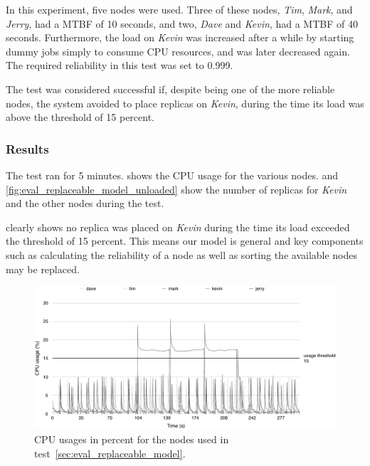 \documentclass{cslthse-msc}
\begin{document}
In this experiment, five nodes were used. Three of these nodes, \emph{Tim}, \emph{Mark}, and \emph{Jerry}, had a MTBF of 10 seconds, and two, \emph{Dave} and \emph{Kevin}, had a MTBF of 40 seconds. Furthermore, the load on \emph{Kevin} was increased after a while by starting dummy jobs simply to consume CPU resources, and was later decreased again. The required reliability in this test was set to 0.999.

The test was considered successful if, despite being one of the more reliable nodes, the system avoided to place replicas on \emph{Kevin}, during the time its load was above the threshold of 15 percent.

\subsubsection*{Results}
The test ran for 5 minutes.  shows the CPU usage for the various nodes.  and \cref{fig:eval_replaceable_model_unloaded} show the number of replicas for \emph{Kevin} and the other nodes during the test.

 clearly shows no replica was placed on \emph{Kevin} during the time its load exceeded the threshold of 15 percent. This means our model is general and key components such as calculating the reliability of a node as well as sorting the available nodes may be replaced. 

\begin{figure}[!hbt]
\centering
\includegraphics[scale=0.5]{images/results/loads/usages.pdf}
\caption{CPU usages in percent for the nodes used in test~\ref{sec:eval_replaceable_model}.} \label{fig:eval_replaceable_model_usages}
\end{figure}
\end{document}
